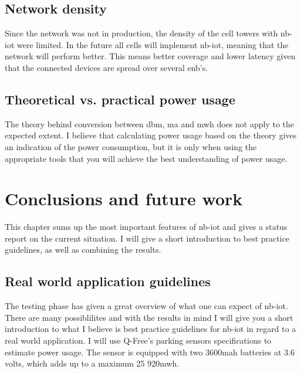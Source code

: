 \documentclass[USenglish]{ifimaster}  %
\begin{document}
\section{Network density}
Since the network was not in production, the density of the cell towers with \acrshort{nb-iot} were limited. In the future all cells will implement \acrshort{nb-iot}, meaning that the network will perform better. This means better coverage and lower latency given that the connected devices are spread over several \acrshort{enb}'s.

\section{Theoretical vs. practical power usage}
The theory behind conversion between \acrshort{dbm}, \acrshort{ma} and \acrshort{mwh} does not apply to the expected extent. I believe that calculating power usage based on the theory gives an indication of the power consumption, but it is only when using the appropriate tools that you will achieve the best understanding of power usage.

\chapter{Conclusions and future work}                     %
This chapter sums up the most important features of \acrshort{nb-iot} and gives a status report on the current situation. I will give a short introduction to best practice guidelines, as well as combining the results.

\section{Real world application guidelines} \label{section:guidelines}
The testing phase has given a great overview of what one can expect of \acrshort{nb-iot}. There are many possiblilites and with the results in mind I will give you a short introduction to what I believe is best practice guidelines for \acrshort{nb-iot} in regard to a real world application. I will use Q-Free's parking sensors specifications to estimate power usage. The sensor is equipped with two 3600\acrshort{mah} batteries at 3.6 volts, which adds up to a maximum 25 920\acrshort{mwh}.
\end{document}
